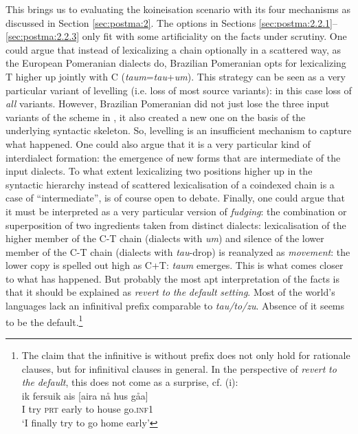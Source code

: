 \documentclass[output=paper,hidelinks,draftmode]{langscibook}
\begin{document}
This brings us to evaluating the koineisation scenario with its four mechanisms as discussed in Section \ref{sec:postma:2}. The options in Sections \ref{sec:postma:2.2.1}--\ref{sec:postma:2.2.3} only fit with some artificiality on the facts under scrutiny. One could argue that instead of lexicalizing a chain optionally in a scattered way, as the European Pomeranian dialects do, Brazilian Pomeranian opts for lexicalizing T higher up jointly with C (\textit{taum}=\textit{tau}+\textit{um}). This strategy can be seen as a very particular variant of levelling (i.e. loss of most source variants): in this case loss of \textit{all} variants. However, Brazilian Pomeranian did not just lose the three input variants of the scheme in , it also created a new one  on the basis of the underlying syntactic skeleton. So, levelling is an insufficient mechanism to capture what happened. One could also argue that it is a very particular kind of interdialect formation: the emergence of new forms that are intermediate of the input dialects. To what extent lexicalizing two positions higher up in the syntactic hierarchy instead of scattered lexicalisation of a coindexed chain is a case of ``intermediate'', is of course open to debate. Finally, one could argue that it must be interpreted as a very particular version of \textit{fudging}: the combination or superposition of two ingredients taken from distinct dialects: lexicalisation of the higher member of the C-T chain (dialects with \textit{um}) and silence of the lower member of the C-T chain (dialects with \textit{tau}{}-drop) is reanalyzed as \textit{movement}: the lower copy is spelled out high as C+T: \textit{taum} emerges. This is what comes closer to what has happened. But probably the most apt interpretation of the facts is that it should be explained as \textit{revert} \textit{to} \textit{the} \textit{default} \textit{setting}. Most of the world's languages lack an infinitival prefix comparable to \textit{tau/to/zu}. Absence of it seems to be the default.\footnote{The claim that the infinitive is without prefix does not only hold for rationale clauses, but for infinitival clauses in general. In the perspective of \textit{revert} \textit{to} \textit{the} \textit{default}, this does not come as a surprise, cf. (i):\\ \vspace{-\baselineskip}
\ea\gll ik fersuik ais [aira nå hus gåa] \\ 
I try \textsc{prt} early to house go.\textsc{inf1}\\ \glt `I finally try to go home early'
}
\end{document}
